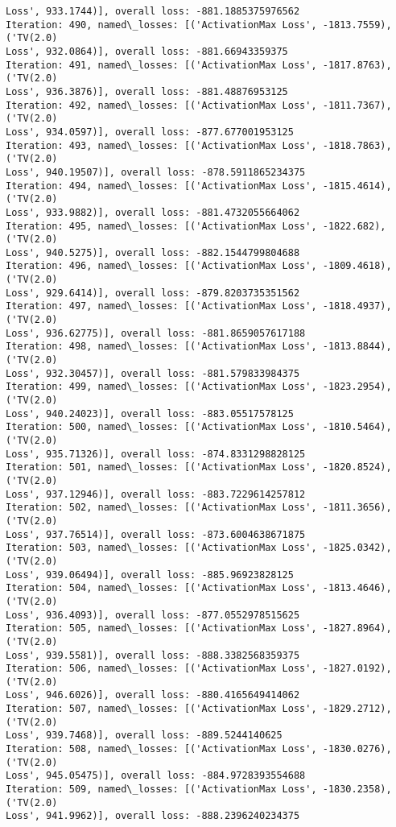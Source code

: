 \documentclass[10pt]{article}
\begin{document}
\begin{Verbatim}[commandchars=\\\{\}]
Loss', 933.1744)], overall loss: -881.1885375976562
Iteration: 490, named\_losses: [('ActivationMax Loss', -1813.7559), ('TV(2.0)
Loss', 932.0864)], overall loss: -881.66943359375
Iteration: 491, named\_losses: [('ActivationMax Loss', -1817.8763), ('TV(2.0)
Loss', 936.3876)], overall loss: -881.48876953125
Iteration: 492, named\_losses: [('ActivationMax Loss', -1811.7367), ('TV(2.0)
Loss', 934.0597)], overall loss: -877.677001953125
Iteration: 493, named\_losses: [('ActivationMax Loss', -1818.7863), ('TV(2.0)
Loss', 940.19507)], overall loss: -878.5911865234375
Iteration: 494, named\_losses: [('ActivationMax Loss', -1815.4614), ('TV(2.0)
Loss', 933.9882)], overall loss: -881.4732055664062
Iteration: 495, named\_losses: [('ActivationMax Loss', -1822.682), ('TV(2.0)
Loss', 940.5275)], overall loss: -882.1544799804688
Iteration: 496, named\_losses: [('ActivationMax Loss', -1809.4618), ('TV(2.0)
Loss', 929.6414)], overall loss: -879.8203735351562
Iteration: 497, named\_losses: [('ActivationMax Loss', -1818.4937), ('TV(2.0)
Loss', 936.62775)], overall loss: -881.8659057617188
Iteration: 498, named\_losses: [('ActivationMax Loss', -1813.8844), ('TV(2.0)
Loss', 932.30457)], overall loss: -881.579833984375
Iteration: 499, named\_losses: [('ActivationMax Loss', -1823.2954), ('TV(2.0)
Loss', 940.24023)], overall loss: -883.05517578125
Iteration: 500, named\_losses: [('ActivationMax Loss', -1810.5464), ('TV(2.0)
Loss', 935.71326)], overall loss: -874.8331298828125
Iteration: 501, named\_losses: [('ActivationMax Loss', -1820.8524), ('TV(2.0)
Loss', 937.12946)], overall loss: -883.7229614257812
Iteration: 502, named\_losses: [('ActivationMax Loss', -1811.3656), ('TV(2.0)
Loss', 937.76514)], overall loss: -873.6004638671875
Iteration: 503, named\_losses: [('ActivationMax Loss', -1825.0342), ('TV(2.0)
Loss', 939.06494)], overall loss: -885.96923828125
Iteration: 504, named\_losses: [('ActivationMax Loss', -1813.4646), ('TV(2.0)
Loss', 936.4093)], overall loss: -877.0552978515625
Iteration: 505, named\_losses: [('ActivationMax Loss', -1827.8964), ('TV(2.0)
Loss', 939.5581)], overall loss: -888.3382568359375
Iteration: 506, named\_losses: [('ActivationMax Loss', -1827.0192), ('TV(2.0)
Loss', 946.6026)], overall loss: -880.4165649414062
Iteration: 507, named\_losses: [('ActivationMax Loss', -1829.2712), ('TV(2.0)
Loss', 939.7468)], overall loss: -889.5244140625
Iteration: 508, named\_losses: [('ActivationMax Loss', -1830.0276), ('TV(2.0)
Loss', 945.05475)], overall loss: -884.9728393554688
Iteration: 509, named\_losses: [('ActivationMax Loss', -1830.2358), ('TV(2.0)
Loss', 941.9962)], overall loss: -888.2396240234375

\end{Verbatim}
\end{document}
